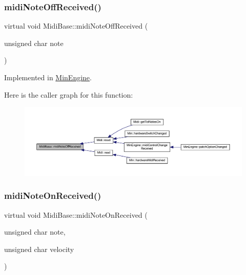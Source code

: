 \subsubsection{\texorpdfstring{midi\+Note\+Off\+Received()}{midiNoteOffReceived()}}
{\footnotesize\ttfamily virtual void Midi\+Base\+::midi\+Note\+Off\+Received (\begin{DoxyParamCaption}\item[{unsigned char}]{note }\end{DoxyParamCaption})\hspace{0.3cm}{\ttfamily [pure virtual]}}



Implemented in \hyperlink{class_min_engine_aaab036105fa3dce51cc8c8345f2edcfe}{Min\+Engine}.

Here is the caller graph for this function\+:
\nopagebreak
\begin{figure}[H]
\begin{center}
\leavevmode
\includegraphics[width=350pt]{de/def/class_midi_base_aa26f04b4ead215bce201e480faf7c914_icgraph}
\end{center}
\end{figure}
\mbox{\label{class_midi_base_aa977f9f3db59b0a8b892ee28bcf93695}} 
\subsubsection{\texorpdfstring{midi\+Note\+On\+Received()}{midiNoteOnReceived()}}
{\footnotesize\ttfamily virtual void Midi\+Base\+::midi\+Note\+On\+Received (\begin{DoxyParamCaption}\item[{unsigned char}]{note,  }\item[{unsigned char}]{velocity }\end{DoxyParamCaption})\hspace{0.3cm}{\ttfamily [pure virtual]}}



